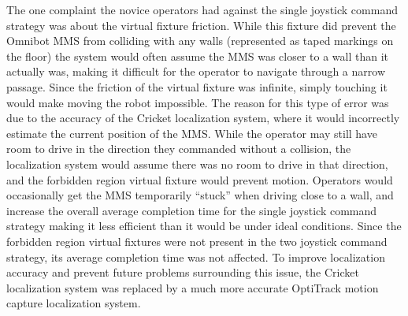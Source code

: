 \documentclass[onecolumn,10pt,final]{asme2ej}
\begin{document}
The one complaint the novice operators had against the single joystick command strategy was about the virtual fixture friction. While this fixture did prevent the Omnibot MMS from colliding with any walls (represented as taped markings on the floor) the system would often assume the MMS was closer to a wall than it actually was, making it difficult for the operator to navigate through a narrow passage. Since the friction of the virtual fixture was infinite, simply touching it would make moving the robot impossible. The reason for this type of error was due to the accuracy of the Cricket localization system, where it would incorrectly estimate the current position of the MMS. While the operator may still have room to drive in the direction they commanded without a collision, the localization system would assume there was no room to drive in that direction, and the forbidden region virtual fixture would prevent motion. Operators would occasionally get the MMS temporarily ``stuck'' when driving close to a wall, and increase the overall average completion time for the single joystick command strategy making it less efficient than it would be under ideal conditions. Since the forbidden region virtual fixtures were not present in the two joystick command strategy, its average completion time was not affected. To improve localization accuracy and prevent future problems surrounding this issue, the Cricket localization system was replaced by a much more accurate OptiTrack motion capture localization system.\\
\end{document}
